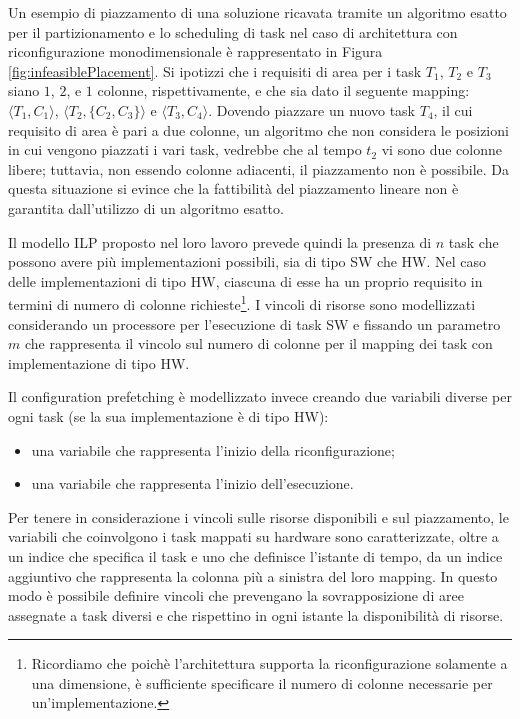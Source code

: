 Un esempio di piazzamento di una soluzione ricavata tramite un algoritmo esatto 
per il partizionamento e lo scheduling di task nel caso di 
architettura con riconfigurazione monodimensionale è rappresentato in 
Figura \ref{fig:infeasiblePlacement}. Si ipotizzi che i requisiti di area per i 
task $T_1$, $T_2$ e $T_3$ siano $1$, $2$, e $1$ colonne, rispettivamente, e che 
sia dato il seguente mapping: $\langle T_1, C_1 \rangle$, $\langle T_2, \{C_2, 
C_3\} \rangle$ e $\langle T_3, C_4 \rangle$. Dovendo piazzare un nuovo task 
$T_4$, il cui requisito di area è pari a due colonne, un algoritmo che non 
considera le posizioni in cui vengono piazzati i vari task, vedrebbe che al 
tempo $t_2$ vi sono due colonne libere; tuttavia, non essendo colonne 
adiacenti, il piazzamento non è possibile. Da questa situazione si evince che 
la fattibilità del piazzamento lineare non è garantita dall'utilizzo di un 
algoritmo esatto.

Il modello ILP proposto nel loro lavoro prevede quindi la presenza di $n$ task 
che possono avere più implementazioni possibili, sia di tipo SW che HW. Nel 
caso delle implementazioni di tipo HW, ciascuna di esse ha un proprio requisito 
in termini di numero di colonne richieste\footnote{Ricordiamo che poichè 
l'architettura supporta la riconfigurazione solamente a una dimensione, è 
sufficiente specificare il numero di colonne necessarie per 
un'implementazione.}. I vincoli di risorse sono modellizzati considerando un 
processore per l'esecuzione di task SW e fissando un parametro $m$ che 
rappresenta il vincolo sul numero di colonne per il mapping dei task con 
implementazione di tipo HW.

Il configuration prefetching è modellizzato invece creando due variabili 
diverse per ogni task (se la sua implementazione è di tipo HW):
\begin{itemize}
 \item una variabile che rappresenta l'inizio della riconfigurazione;
 \item una variabile che rappresenta l'inizio dell'esecuzione.
\end{itemize}
Per tenere in considerazione i vincoli sulle risorse disponibili e sul 
piazzamento, le variabili che coinvolgono i task mappati su hardware sono 
caratterizzate, oltre a un indice che specifica il task e uno che definisce 
l'istante di tempo, da un indice aggiuntivo che rappresenta la colonna più a 
sinistra del loro mapping. In questo modo è possibile definire vincoli che 
prevengano la sovrapposizione di aree assegnate a task diversi e che rispettino 
in ogni istante la disponibilità di risorse.


